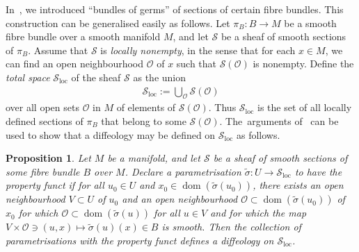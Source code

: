 \documentclass[10pt,a4paper]{amsart}
\numberwithin{equation}{section}
\newtheorem{Proposition}[Theorem]{Proposition}
\def\loc{\operatorname{loc}}
\def\dom{\operatorname{dom}}
\def\OO{{\mathcal{O}}}
\def\SS{{\mathscr{S}}}
\begin{document}
In~\cite{mac3}, we introduced ``bundles of germs'' of sections of certain fibre bundles. This construction can be generalised easily as follows. Let $\pi_{B}\colon B\rightarrow M$ be a smooth fibre bundle over a smooth manifold $M$, and let $\SS$ be a sheaf of smooth sections of $\pi_{B}$. Assume that $\SS$ is \textit{locally nonempty}, in the sense that for each $x\in M$, we can find an open neighbourhood $\mathcal{O}$ of $x$ such that $\SS(\mathcal{O})$ is nonempty. Define the \textit{total space} $\SS_{\loc}$ of the sheaf $\SS$ as the union
\begin{gather*}
\SS_{\loc}:=\bigcup_{\mathcal{O}}\SS(\mathcal{O})
\end{gather*}
over all open sets $\mathcal{O}$ in $M$ of elements of $\SS(\mathcal{O})$. Thus $\SS_{\loc}$ is the set of all locally defined sections of $\pi_{B}$ that belong to some $\SS(\mathcal{O})$. The~arguments of~\cite[Section~1.63]{diffeology} can be used to show that a diffeology may be defined on $\SS_{\loc}$ as follows.

\begin{Proposition}\label{functprop}
Let $M$ be a manifold, and let $\SS$ be a sheaf of smooth sections of some fibre bundle $B$ over $M$. Declare a parametrisation $\tilde{\sigma}\colon U\rightarrow \SS_{\loc}$ to have the property \textit{funct} if for all $u_{0}\in U$ and $x_{0}\in\dom(\tilde{\sigma}(u_{0}))$, there exists an open neighbourhood $V\subset U$ of $u_{0}$ and an open neighbourhood $\OO\subset \dom(\tilde{\sigma}(u_{0}))$ of $x_{0}$ for which $\OO\subset\dom(\tilde{\sigma}(u))$ for all $u\in V$ and for which the map $V\times\OO\ni(u,x)\mapsto\tilde{\sigma}(u)(x)\in B$ is smooth. Then the collection of parametrisations with the property \textit{funct} defines a diffeology on $\SS_{\loc}$.
\end{Proposition}
\end{document}
